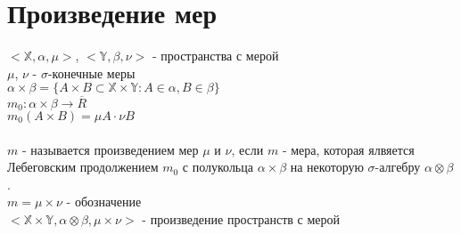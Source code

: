 \documentclass[paper=a4, fontsize=15pt]{article}
\begin{document}
\section{Произведение мер}
$<\mathds{X}, \alpha, \mu>$, $<\mathds{Y}, \beta, \nu>$ - пространства с мерой\\
$\mu$, $\nu$ - $\sigma$-конечные меры\\
$\alpha \times \beta = \{A\times B \subset \mathds{X} \times \mathds{Y} : A \in \alpha, B \in \beta \}$ \\
$m_0 : \alpha \times \beta \rightarrow \overline R$\\ $m_0(A \times B) = \mu A \cdot \nu B$ \\\\
$m$ - называется произведением мер $\mu$ и $\nu$, если $m$ - мера, которая ялвяется Лебеговским продолжением $m_0$ с полукольца $\alpha \times \beta$ на некоторую $\sigma$-алгебру $\alpha \otimes \beta$.\\
$m = \mu \times \nu$ - обозначение \\
$<\mathds{X} \times \mathds{Y}, \alpha \otimes \beta, \mu \times \nu>$ - произведение пространств с мерой
\end{document}
